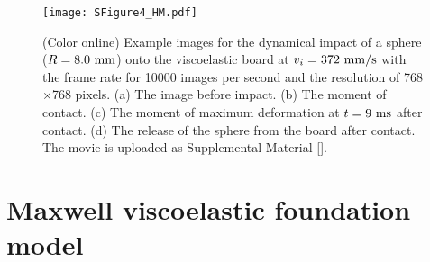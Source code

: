 \documentclass[default,iicol,10pt]{sn-jnl}%
\theoremstyle{thmstyleone}%
\theoremstyle{thmstyletwo}%
\theoremstyle{thmstylethree}%
\begin{document}
\begin{figure}[h!]
  \texttt{[image: SFigure4\_HM.pdf]}
  \caption{(Color online) Example images for the dynamical impact of a sphere ($R={\rm 8.0~mm}$) onto the viscoelastic board at $v_i={\rm 372~mm/s}$ with the frame rate for 10000 images per second and the resolution of 768$\times$768 pixels. (a) The image before impact. (b) The moment of contact. (c) The moment of maximum deformation at $t={\rm 9~ms}$ after contact. (d) The release of the sphere from the board after contact. The movie is uploaded as Supplemental Material [].  \label{fig:FS3}}
\end{figure}

\section{Maxwell viscoelastic foundation model}
\end{document}
